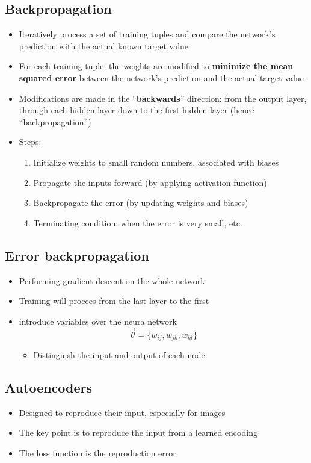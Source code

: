 \documentclass{article}
\begin{document}
    \subsection{Backpropagation}
    \begin{itemize}
        \item Iteratively process a set of training tuples and compare the network's prediction with the actual known target value
        \item For each training tuple, the weights are modified to \textbf{minimize the mean squared error} between the network's prediction and the actual target value
        \item Modifications are made in the ``\textbf{backwards}'' direction: from the output layer, through each hidden layer down to the first hidden layer (hence ``backpropagation'')
        \item Steps:
        \begin{enumerate}
            \item Initialize weights to small random numbers, associated with biases
            \item Propagate the inputs forward (by applying activation function)
            \item Backpropagate the error (by updating weights and biases)
            \item Terminating condition: when the error is very small, etc.
        \end{enumerate}
    \end{itemize}

    \subsection{Error backpropagation}
    \begin{itemize}
        \item Performing gradient descent on the whole network
        \item Training will procees from the last layer to the first
        \item introduce variables over the neura network
        \[ \vec{\theta} = \{w_{ij}, w_{jk}, w_{kl}\} \]
        \begin{itemize}
            \item Distinguish the input and output of each node
        \end{itemize}
    \end{itemize}

    \subsection{Autoencoders}
    \begin{itemize}
        \item Designed to reproduce their input, especially for images
        \item The key point is to reproduce the input from a learned encoding
        \item The loss function is the reproduction error
    \end{itemize}
\end{document}
